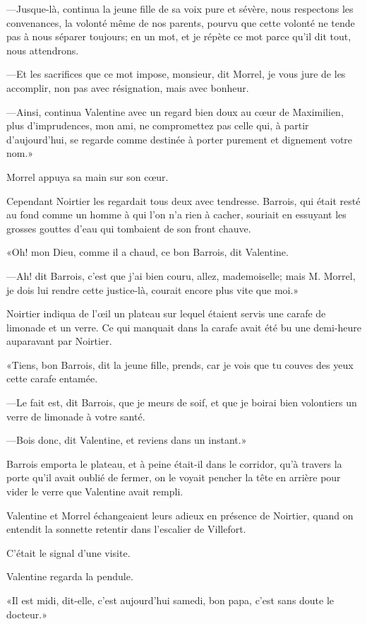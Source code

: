 —Jusque-là, continua la jeune fille de sa voix pure et sévère, nous respectons les convenances, la volonté même de nos parents, pourvu que cette volonté ne tende pas à nous séparer toujours; en un mot, et je répète ce mot parce qu'il dit tout, nous attendrons. 

—Et les sacrifices que ce mot impose, monsieur, dit Morrel, je vous jure de les accomplir, non pas avec résignation, mais avec bonheur. 

—Ainsi, continua Valentine avec un regard bien doux au cœur de Maximilien, plus d'imprudences, mon ami, ne compromettez pas celle qui, à partir d'aujourd'hui, se regarde comme destinée à porter purement et dignement votre nom.» 

Morrel appuya sa main sur son cœur. 

Cependant Noirtier les regardait tous deux avec tendresse. Barrois, qui était resté au fond comme un homme à qui l'on n'a rien à cacher, souriait en essuyant les grosses gouttes d'eau qui tombaient de son front chauve. 

«Oh! mon Dieu, comme il a chaud, ce bon Barrois, dit Valentine. 

—Ah! dit Barrois, c'est que j'ai bien couru, allez, mademoiselle; mais M. Morrel, je dois lui rendre cette justice-là, courait encore plus vite que moi.» 

Noirtier indiqua de l'œil un plateau sur lequel étaient servis une carafe de limonade et un verre. Ce qui manquait dans la carafe avait été bu une demi-heure auparavant par Noirtier. 

«Tiens, bon Barrois, dit la jeune fille, prends, car je vois que tu couves des yeux cette carafe entamée. 

—Le fait est, dit Barrois, que je meurs de soif, et que je boirai bien volontiers un verre de limonade à votre santé. 

—Bois donc, dit Valentine, et reviens dans un instant.» 

Barrois emporta le plateau, et à peine était-il dans le corridor, qu'à travers la porte qu'il avait oublié de fermer, on le voyait pencher la tête en arrière pour vider le verre que Valentine avait rempli. 

Valentine et Morrel échangeaient leurs adieux en présence de Noirtier, quand on entendit la sonnette retentir dans l'escalier de Villefort. 

C'était le signal d'une visite. 

Valentine regarda la pendule. 

«Il est midi, dit-elle, c'est aujourd'hui samedi, bon papa, c'est sans doute le docteur.» 

